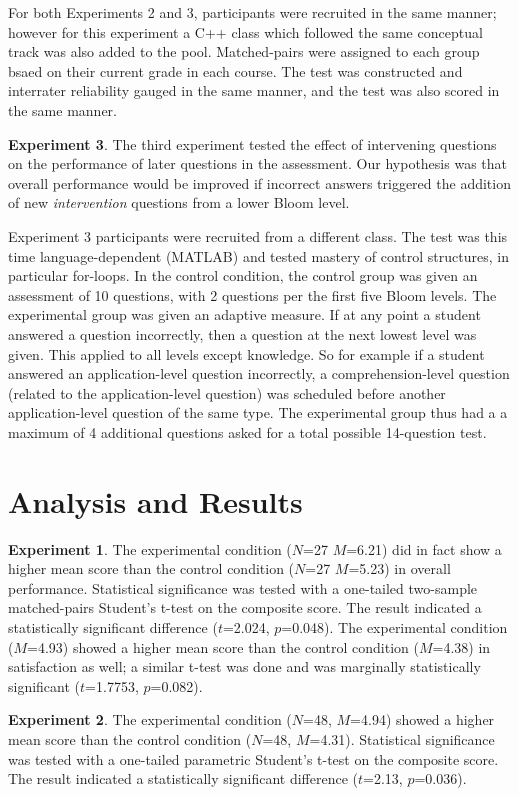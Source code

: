 \documentclass[a4paper,twocolumn]{article}
\begin{document}
For both Experiments 2 and 3, participants were recruited in the same manner;
however for this experiment a C++ class which followed the same conceptual
track was also added to the pool. Matched-pairs were assigned to each group
bsaed on their current grade in each course.  The test was constructed and
interrater reliability gauged in the same manner, and the test was also scored
in the same manner.

\textbf{Experiment 3}. The third experiment tested the effect of intervening
questions on the performance of later questions in the assessment.  Our
hypothesis was that overall performance would be improved if incorrect answers
triggered the addition of new {\em intervention} questions from a lower Bloom
level.

Experiment 3 participants were recruited from a different class. The test was
this time language-dependent (MATLAB) and tested mastery of control structures,
in particular for-loops.  In the control condition, the control group was given
an assessment of 10 questions, with 2 questions per the first five Bloom
levels. The experimental group was given an adaptive measure.  If at any point
a student answered a question incorrectly, then a question at the next lowest
level was given.  This applied to all levels except knowledge.  So for example
if a student answered an application-level question incorrectly, a
comprehension-level question (related to the application-level question) was
scheduled before another application-level question of the same type.  The
experimental group thus had a a maximum of 4 additional questions asked for a
total possible 14-question test.

\section{Analysis and Results}

\textbf{Experiment 1}. The experimental condition ($N$=27 $M$=6.21) did in fact
show a higher mean score than the control condition ($N$=27 $M$=5.23) in
overall performance.  Statistical significance was tested with a one-tailed
two-sample matched-pairs Student's t-test on the composite score. The result
indicated a statistically significant difference ($t$=2.024, $p$=0.048).  The
experimental condition ($M$=4.93) showed a higher mean score than the control
condition ($M$=4.38) in satisfaction as well; a similar t-test was done and was
marginally statistically significant ($t$=1.7753, $p$=0.082).  


\textbf{Experiment 2}. The experimental condition ($N$=48, $M$=4.94) showed a
higher mean score than the control condition ($N$=48, $M$=4.31).  Statistical
significance was tested with a one-tailed parametric Student's t-test on the
composite score.  The result indicated a statistically significant difference
($t$=2.13, $p$=0.036).
\end{document}
